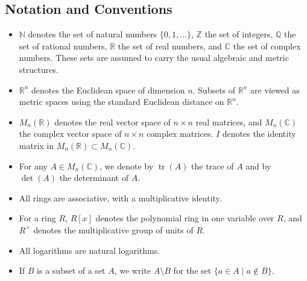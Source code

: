 \documentclass[11pt, a4paper]{article}
\begin{document}
\subsection*{Notation and Conventions}
\begin{itemize}
  \item $\mathbb{N}$ denotes the set of natural numbers $\{0, 1, \dots\}$, $\mathbb{Z}$ the set of integers, $\mathbb{Q}$ the set of rational numbers, $\mathbb{R}$ the set of real numbers, and $\mathbb{C}$ the set of complex numbers. These sets are assumed to carry the usual algebraic and metric structures.
  \item $\mathbb{R}^n$ denotes the Euclidean space of dimension $n$. Subsets of $\mathbb{R}^n$ are viewed as metric spaces using the standard Euclidean distance on $\mathbb{R}^n$.
  \item $M_n(\mathbb{R})$ denotes the real vector space of $n \times n$ real matrices, and $M_n(\mathbb{C})$ the complex vector space of $n \times n$ complex matrices. $I$ denotes the identity matrix in $M_n(\mathbb{R}) \subset M_n(\mathbb{C})$.
  \item For any $A \in M_n(\mathbb{C})$, we denote by $\operatorname{tr}(A)$ the trace of $A$ and by $\det(A)$ the determinant of $A$.
  \item All rings are associative, with a multiplicative identity.
  \item For a ring $R$, $R[x]$ denotes the polynomial ring in one variable over $R$, and $R^\times$ denotes the multiplicative group of units of $R$.
  \item All logarithms are natural logarithms.
  \item If $B$ is a subset of a set $A$, we write $A \setminus B$ for the set $\{a \in A \mid a \notin B\}$.
\end{itemize}
\end{document}
